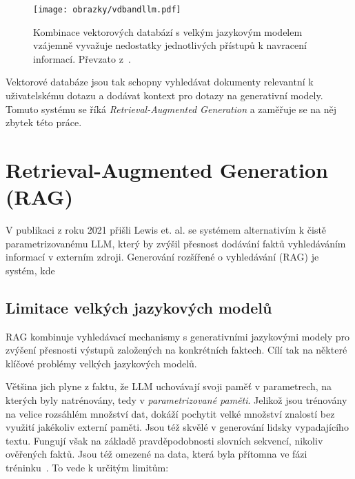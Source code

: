 \begin{figure}[H]
    \centering
    \texttt{[image: obrazky/vdbandllm.pdf]}
    \caption{Kombinace vektorových databází s velkým jazykovým modelem vzájemně vyvažuje nedostatky jednotlivých přístupů k navracení informací. Převzato z~\cite{compreh_survey_vdb}.}
    \label{fig:vdbandllm}
\end{figure}

Vektorové databáze jsou tak schopny vyhledávat dokumenty relevantní k uživatelskému dotazu a dodávat kontext pro dotazy na generativní modely. Tomuto systému se říká \textit{Retrieval-Augmented Generation} a zaměřuje se na něj zbytek této práce.

\chapter{Retrieval-Augmented Generation (RAG)}
\label{rag}
V publikaci z roku 2021 přišli Lewis et. al. \cite{lewis_rag} se systémem alternativím k čistě parametrizovanému LLM, který by zvýšil přesnost dodávání faktů vyhledáváním informací v externím zdroji. Generování rozšířené o vyhledávání (RAG) je systém, kde ~\cite{lewis_rag}

\section{Limitace velkých jazykových modelů}
RAG kombinuje vyhledávací mechanismy s generativními jazykovými modely pro zvýšení přesnosti výstupů založených na konkrétních faktech. Cílí tak na některé klíčové problémy velkých jazykových modelů.

Většina jich plyne z faktu, že LLM uchovávají svoji paměť v parametrech, na kterých byly natrénovány, tedy v \textit{parametrizované paměti}. Jelikož jsou trénovány na velice rozsáhlém množství dat, dokáží pochytit velké množství znalostí bez využití jakékoliv externí paměti. Jsou též skvělé v generování lidsky vypadajícího textu. Fungují však na základě pravděpodobnosti slovních sekvencí, nikoliv ověřených faktů. Jsou též omezené na data, která byla přítomna ve fázi tréninku~\cite{lewis_rag, compreh_rag}. To vede k určitým limitům:


